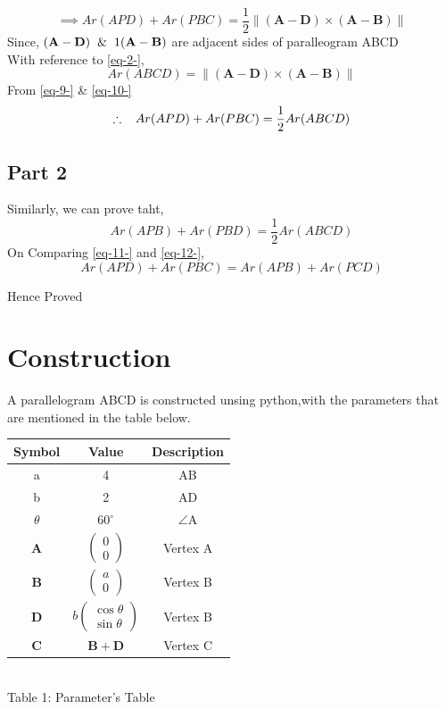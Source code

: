 \documentclass[journal,10pt,twocolumn]{article}
\providecommand{\norm}[1]{\left\lVert#1\right\rVert}
\let\vec\mathbf
\newcommand{\myvec}[1]{\ensuremath{\begin{pmatrix}#1\end{pmatrix}}}
\begin{document}
\begin{equation}
\implies Ar(APD) + Ar(PBC) = \frac{1}{2}\norm{\vec{(A-D)}\times\vec{(A-B)}}
\label{eq-9-}
\end{equation}
Since, $\vec{(A-D)} \hspace{2mm} \& \hspace{2mm} 1\vec{(A-B)}$ are adjacent sides of paralleogram ABCD
\\With reference to \eqref{eq-2-},
\begin{equation}
Ar(ABCD) = \norm{\vec{(A-D)}\times\vec{(A-B)}}
\label{eq-10-}
\end{equation}
From \eqref{eq-9-} \& \eqref{eq-10-}
\begin{equation}
\therefore \hspace{3mm} Ar(APD)+Ar(PBC) = \frac{1}{2}Ar(ABCD)
\label{eq-11-}
\end{equation}

\subsection*{Part 2}
Similarly, we can prove taht,
\begin{equation}
Ar(APB)+Ar(PBD) = \frac{1}{2}Ar(ABCD)
\label{eq-12-}
\end{equation}
On Comparing \eqref{eq-11-} and \eqref{eq-12-},
\begin{equation}
Ar(APD)+Ar(PBC) = Ar(APB)+Ar(PCD)
\label{eq-13-}
\end{equation}
\begin{center}
Hence Proved
\end{center}
\section*{Construction}
\raggedright A parallelogram ABCD is constructed unsing python,with the parameters that are mentioned in the table below.
\vspace{5mm}
\begin{center}
    \setlength{\arrayrulewidth}{0.1mm}
	\setlength{\tabcolsep}{12pt}
	\renewcommand{\arraystretch}{1.5}
\begin{tabular}{|c|c|c|}
	\hline 
    \textbf{Symbol} & \textbf{Value} & \textbf{Description}\\ 		\hline
    a & 4 & AB \\ \hline
    b & 2 & AD \\ \hline
    $\theta$ & 60$^{\circ}$ & $\angle$A \\ \hline
    $\vec{A}$ & $\myvec{0 \\ 0}$ & Vertex A \\ \hline
    $\vec{B}$ & $\myvec{a \\ 0}$ & Vertex B \\ \hline
    $\vec{D}$ & $b\myvec{\cos\theta \\ \sin\theta}$ & Vertex B \\ \hline
    $\vec{C}$ & $\vec{B+D}$ & Vertex C \\ \hline
    
\end{tabular}\\ \vspace{2mm}
Table 1: Parameter's Table
\end{center}
\end{document}
